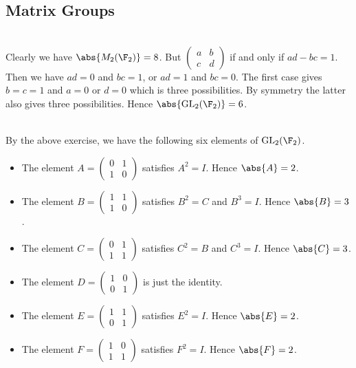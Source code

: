 \documentclass[a4paper]{article}
\begin{document}
\subsection{Matrix Groups}
\begin{ex}{}{}\\
Clearly we have $\abs{M_2(\F_2)}=8$. But $\begin{pmatrix}
a & b\\
c & d
\end{pmatrix}$ if and only if $ad-bc=1$. Then we have $ad=0$ and $bc=1$, or $ad=1$ and $bc=0$. The first case gives $b=c=1$ and $a=0$ or $d=0$ which is three possibilities. By symmetry the latter also gives three possibilities. Hence $\abs{\text{GL}_2(\F_2)}=6$. 
\end{ex}

\begin{ex}{}{}\\
By the above exercise, we have the following six elements of $\text{GL}_2(\F_2)$. 
\begin{itemize}
\item The element $A=\begin{pmatrix}
0 & 1\\1 & 0
\end{pmatrix}$ satisfies $A^2=I$. Hence $\abs{A}=2$. 
\item The element $B=\begin{pmatrix}
1 & 1\\1 & 0
\end{pmatrix}$ satisfies $B^2=C$ and $B^3=I$. Hence $\abs{B}=3$. 
\item The element $C=\begin{pmatrix}
0 & 1\\1 & 1
\end{pmatrix}$ satisfies $C^2=B$ and $C^3=I$. Hence $\abs{C}=3$. 
\item The element $D=\begin{pmatrix}
1 & 0\\0 & 1
\end{pmatrix}$ is just the identity. 
\item The element $E=\begin{pmatrix}
1 & 1\\0 & 1
\end{pmatrix}$ satisfies $E^2=I$. Hence $\abs{E}=2$. 
\item The element $F=\begin{pmatrix}
1 & 0\\1 & 1
\end{pmatrix}$ satisfies $F^2=I$. Hence $\abs{F}=2$. 
\end{itemize}
\end{ex}
\end{document}
